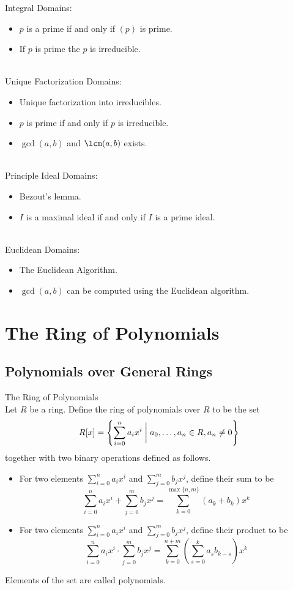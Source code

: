 \documentclass[a4paper]{article}
\begin{document}
Integral Domains: 
\begin{itemize}
\item $p$ is a prime if and only if $(p)$ is prime. 
\item If $p$ is prime the $p$ is irreducible. 
\end{itemize}~\\
Unique Factorization Domains: 
\begin{itemize}
\item Unique factorization into irreducibles. 
\item $p$ is prime if and only if $p$ is irreducible. 
\item $\gcd(a,b)$ and $\lcm(a,b)$ exists. 
\end{itemize}~\\
Principle Ideal Domains: 
\begin{itemize}
\item Bezout's lemma. 
\item $I$ is a maximal ideal if and only if $I$ is a prime ideal. 
\end{itemize}~\\
Euclidean Domains: 
\begin{itemize}
\item The Euclidean Algorithm. 
\item $\gcd(a,b)$ can be computed using the Euclidean algorithm. 
\end{itemize}

\pagebreak
\section{The Ring of Polynomials}
\subsection{Polynomials over General Rings}
\begin{defn}{The Ring of Polynomials}{}\\
Let $R$ be a ring. Define the ring of polynomials over $R$ to be the set $$R[x]=\left\{\sum_{i=0}^na_ix^i\;\bigg{|}\;a_0,\dots,a_n\in R, a_n\neq 0\right\}$$ together with two binary operations defined as follows. 
\begin{itemize}
\item For two elements $\sum_{i=0}^na_ix^i$ and $\sum_{j=0}^mb_jx^j$, define their sum to be $$\sum_{i=0}^na_ix^i+\sum_{j=0}^mb_jx^j=\sum_{k=0}^{\max\{n,m\}}(a_k+b_k)x^k$$
\item For two elements $\sum_{i=0}^na_ix^i$ and $\sum_{j=0}^mb_jx^j$, define their product to be $$\sum_{i=0}^na_ix^i\cdot\sum_{j=0}^mb_jx^j=\sum_{k=0}^{n+m}\left(\sum_{s=0}^ka_sb_{k-s}\right)x^k$$
\end{itemize}
Elements of the set are called polynomials. 
\end{defn}
\end{document}
